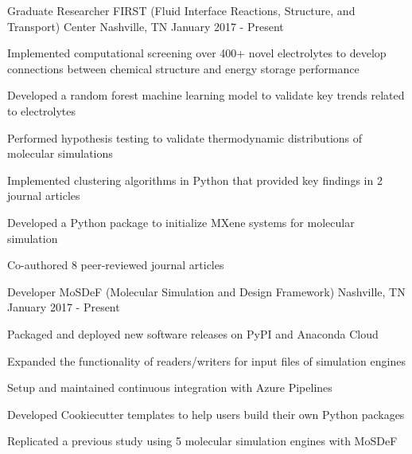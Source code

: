 
\begin{cventries}
  \cventry
    {Graduate Researcher} %
    {FIRST (Fluid Interface Reactions, Structure, and Transport) Center} %
    {Nashville, TN} %
    {January 2017 - Present} %
    {
      \begin{cvitems} %
        \item{Implemented computational screening over 400+ novel electrolytes to
        develop \newline
        connections between chemical structure and energy storage performance}
        \item {Developed a random forest machine learning model to validate key trends related to
            electrolytes}
        \item{Performed hypothesis testing to validate thermodynamic
            distributions of molecular simulations}
        \item {Implemented clustering algorithms in Python that
            provided key findings in 2 journal articles}
        \item {Developed a Python package to initialize
            MXene systems for molecular simulation}
        \item {Co-authored 8 peer-reviewed journal articles}
      \end{cvitems}
    }

  \cventry
    {Developer} %
    {MoSDeF (Molecular Simulation and Design Framework)} %
    {Nashville, TN} %
    {January 2017 - Present} %
    {
      \begin{cvitems} %
      \item {Packaged and deployed new software releases on PyPI and Anaconda
          Cloud}
        \item {Expanded the functionality of readers/writers for input files of
            simulation engines}
        \item{Setup and maintained continuous integration with Azure Pipelines}
        \item{Developed Cookiecutter templates to help users build 
            their own Python packages}
        \item{Replicated a previous study
            using 5 molecular simulation engines with MoSDeF}
      \end{cvitems}
    }
\end{cventries}
